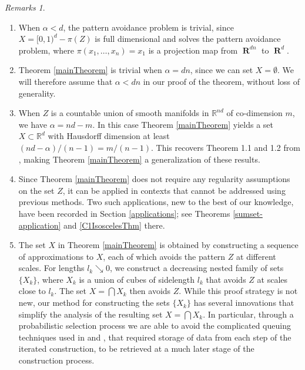 \documentclass[dvipsnames,letterpaper,12pt]{article}
\numberwithin{equation}{section}
\theoremstyle{plain}
\theoremstyle{remark}
\newtheorem*{remarks}{Remarks}
\DeclareMathOperator{\RR}{\mathbf{R}}
\begin{document}
\begin{remarks}
	\ 
	\begin{enumerate}[1.]
		\item When $\alpha < d$, the pattern avoidance problem is trivial, since $X = [0,1)^d - \pi(Z)$ is full dimensional and solves the pattern avoidance problem, where $\pi(x_1, \dots, x_n) = x_1$ is a projection map from $\RR^{dn}$ to $\RR^d$.

		\item Theorem \ref{mainTheorem} is trivial when $\alpha = dn$, since we can set $X = \emptyset$.
		We will therefore assume that $\alpha < dn$ in our proof of the theorem, without loss of generality.

		\item When $Z$ is a countable union of smooth manifolds in $\mathbb R^{nd}$ of co-dimension $m$, we have $\alpha = nd - m$. In this case Theorem \ref{mainTheorem} yields a set $X \subset \mathbb R^d$ with Hausdorff dimension at least $(nd - \alpha)/(n-1) = m/(n-1)$. This recovers Theorem 1.1 and 1.2 from \cite{MalabikaRob}, making Theorem \ref{mainTheorem} a generalization of these results.

		\item Since Theorem \ref{mainTheorem} does not require any regularity assumptions on the set $Z$, it can be applied in contexts that cannot be addressed using previous methods. Two such applications, new to the best of our knowledge, have been recorded in Section \ref{applications}; see Theorems \ref{sumset-application} and \ref{C1IsoscelesThm} there.

		\item\label{remarkSolutionDescription} The set $X$ in Theorem \ref{mainTheorem} is obtained by constructing a sequence of approximations to $X$, each of which avoids the pattern $Z$ at different scales. For lengths $l_k \searrow 0$, we construct a decreasing nested family of sets $\{ X_k \}$, where $X_k$ is a union of cubes of sidelength $l_k$ that avoids $Z$ at scales close to $l_k$. The set $X = \bigcap X_k$ then avoids $Z$. While this proof strategy is not new, our method for constructing the sets $\{X_k\}$ has several innovations that simplify the analysis of the resulting set $X=\bigcap X_k$. In particular, through a probabilistic selection process we are able to avoid the complicated queuing techniques used in \cite{KeletiDimOneSet} and \cite{MalabikaRob}, that required storage of data from each step of the iterated construction, to be retrieved at a much later stage of the construction process.


\end{enumerate}
\end{remarks}
\end{document}
